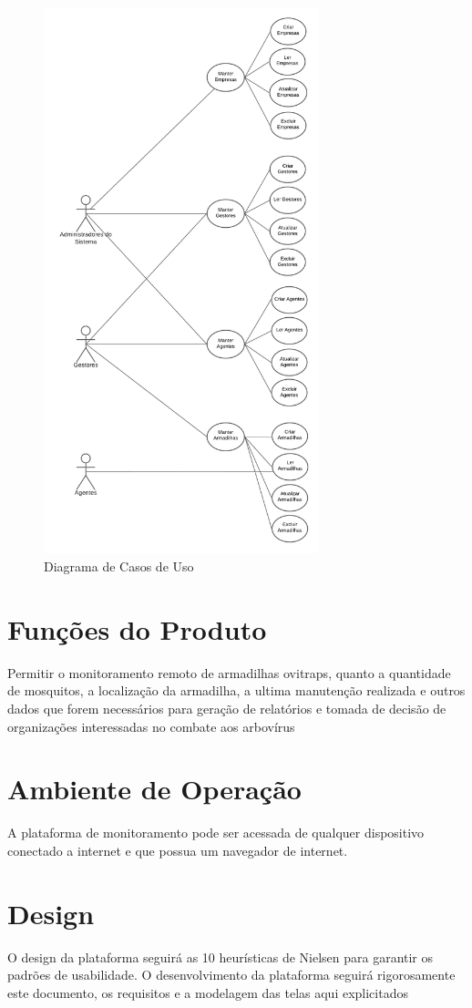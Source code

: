 	\begin{figure}[H]
		\centering
		\includegraphics[width=8cm]{imagens/casosDeUso.png}
		\caption{Diagrama de Casos de Uso}
	\end{figure}
	
	\section*{Funções do Produto}
	Permitir o monitoramento remoto de armadilhas ovitraps, quanto a quantidade de mosquitos, a localização da armadilha, a ultima manutenção realizada e outros dados que forem necessários para geração de relatórios e tomada de decisão de organizações interessadas no combate aos arbovírus 
	
	\section*{Ambiente de Operação}
	A plataforma de monitoramento pode ser acessada de qualquer dispositivo conectado a internet e que possua um navegador de internet.
	
	\section*{Design}
	O design da plataforma seguirá as 10 heurísticas de Nielsen para garantir os padrões de usabilidade. O desenvolvimento da plataforma seguirá rigorosamente este documento, os requisitos e a modelagem das telas aqui explicitados
	
